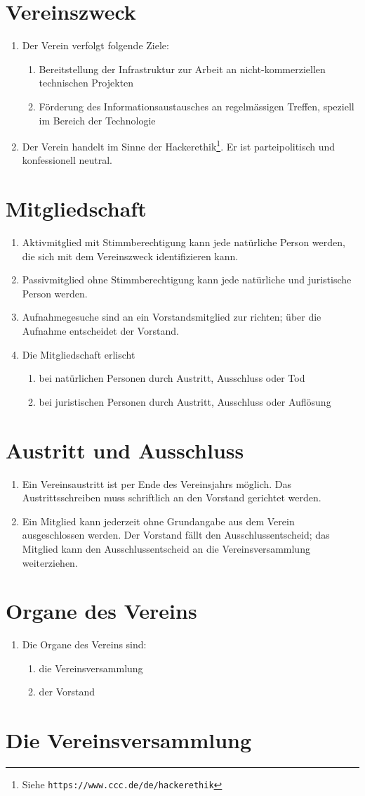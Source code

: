 \documentclass[10pt,a4paper,parskip,fleqn]{scrartcl}
\newcommand{\ol}{\begin{enumerate}[itemsep=-0.2em,topsep=-0.2em]}
\newcommand{\lo}{\end{enumerate}}
\newcommand{\li}{\item}
\begin{document}
\section{Vereinszweck}

\ol
	\li Der Verein verfolgt folgende Ziele:
    \ol
      \li Bereitstellung der Infrastruktur zur Arbeit an nicht-kommerziellen
			technischen Projekten
      \li Förderung des Informationsaustausches an regelmässigen Treffen,
			speziell im Bereich der Technologie
    \lo
		\li Der Verein handelt im Sinne der
		Hackerethik\footnote{Siehe \texttt{https://www.ccc.de/de/hackerethik}}. Er
		ist parteipolitisch und konfessionell neutral.
\lo


\section{Mitgliedschaft}

\ol
  \li Aktivmitglied mit Stimmberechtigung kann jede natürliche Person werden,
	die sich mit dem Vereinszweck identifizieren kann.
	\li Passivmitglied ohne Stimmberechtigung kann jede natürliche und juristische
	Person werden.
	\li Aufnahmegesuche sind an ein Vorstandsmitglied zur richten; über die
	Aufnahme entscheidet der Vorstand.
	\li Die Mitgliedschaft erlischt
		\ol
			\li bei natürlichen Personen durch Austritt, Ausschluss oder Tod
			\li bei juristischen Personen durch Austritt, Ausschluss oder Auflösung
		\lo
\lo


\section{Austritt und Ausschluss}

\ol
	\li Ein Vereinsaustritt ist per Ende des Vereinsjahrs möglich. Das
	Austrittsschreiben muss schriftlich an den Vorstand gerichtet werden.
	\li Ein Mitglied kann jederzeit ohne Grundangabe aus dem Verein ausgeschlossen
	werden. Der Vorstand fällt den Ausschlussentscheid; das Mitglied kann den
	Ausschlussentscheid an die Vereinsversammlung weiterziehen.
\lo


\section{Organe des Vereins}

\ol
	\li Die Organe des Vereins sind:
		\ol
			\li die Vereinsversammlung
			\li der Vorstand
		\lo
\lo


\section{Die Vereinsversammlung}
\end{document}
